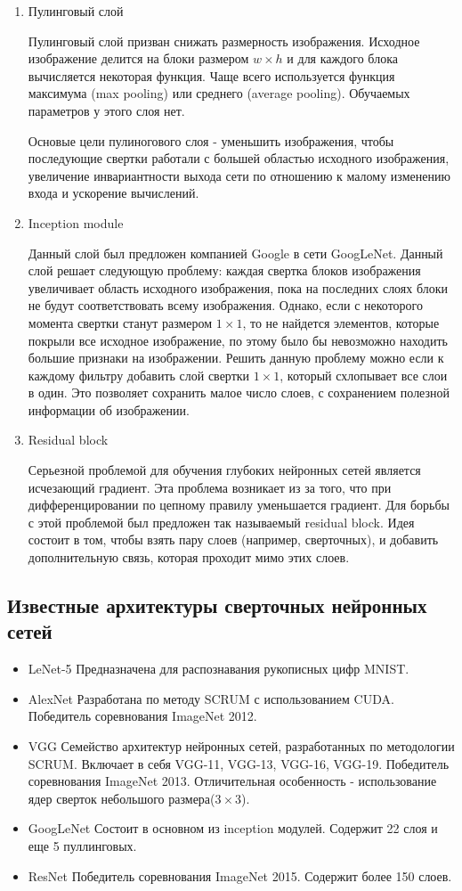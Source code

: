 {\begin{enumerate}
\item Пулинговый слой

Пулинговый слой призван снижать размерность изображения. Исходное изображение делится на блоки
размером \(w \times h\) и для каждого блока вычисляется некоторая функция. Чаще всего используется
функция максимума (max pooling) или среднего (average pooling). Обучаемых параметров у этого слоя
нет.

Основые цели пулиногового слоя - уменьшить изображения, чтобы последующие свертки работали с
большей областью исходного изображения, увеличение инвариантности выхода сети по отношению к
малому изменению входа и ускорение вычислений.

\item Inception module

Данный слой был предложен компанией Google в сети GoogLeNet. Данный слой решает следующую
проблему: каждая свертка блоков изображения увеличивает область исходного изображения, пока на
последних слоях блоки не будут соответствовать всему изображения. Однако, если с некоторого
момента свертки станут размером \(1 \times 1\), то не найдется элементов, которые покрыли все
исходное изображение, по этому было бы невозможно находить большие признаки на
изображении. Решить данную проблему можно если к каждому фильтру добавить слой свертки \(1 \times
   1\), который схлопывает все слои в один. Это позволяет сохранить малое число слоев, с сохранением
полезной информации об изображении.

\item Residual block

Серьезной проблемой для обучения глубоких нейронных сетей является исчезающий градиент. Эта
проблема возникает из за того, что при дифференцировании по цепному правилу уменьшается
градиент. Для борьбы с этой проблемой был предложен так называемый residual block. Идея состоит
в том, чтобы взять пару слоев (например, сверточных), и добавить дополнительную связь, которая
проходит мимо этих слоев.
\end{enumerate}

\subsection{Известные архитектуры сверточных нейронных сетей}
\begin{itemize}
\item LeNet-5 Предназначена для распознавания рукописных цифр MNIST.
\item AlexNet Разработана по методу SCRUM с использованием CUDA. Победитель соревнования ImageNet 2012.
\item VGG Семейство архитектур нейронных сетей, разработанных по методологии SCRUM. Включает в себя
VGG-11, VGG-13, VGG-16, VGG-19. Победитель соревнования ImageNet 2013. Отличительная особенность -
использование ядер сверток небольшого размера(\(3 \times 3\)).
\item GoogLeNet Состоит в основном из inception модулей. Содержит 22 слоя и еще 5 пуллинговых.
\item ResNet Победитель соревнования ImageNet 2015. Содержит более 150 слоев.
\end{itemize}

}
